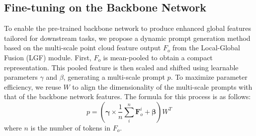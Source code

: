 %
%


\subsection{Fine-tuning on the Backbone Network}
\label{sec:FT_backbone}
To enable the pre-trained backbone network to produce enhanced global features tailored for downstream tasks, we propose a dynamic prompt generation method based on the multi-scale point cloud feature output $F_{o}$ from the Local-Global Fusion (LGF) module. First, $F_{o}$ is mean-pooled to obtain a compact representation. This pooled feature is then scaled and shifted using learnable parameters $\gamma$ and $\beta$, generating a multi-scale prompt $p$. To maximize parameter efficiency, we reuse $W$ to align the dimensionality of the multi-scale prompts with that of the backbone network features. The formula for this process is as follows:
\begin{equation}
	p = \left( \boldsymbol{\gamma} \times \frac{1}{n}\sum_i^n{\boldsymbol{F}_{o}^i} + \boldsymbol{\beta} \right) W^T
\end{equation}
where $n$ is the number of tokens in $F_o$.

